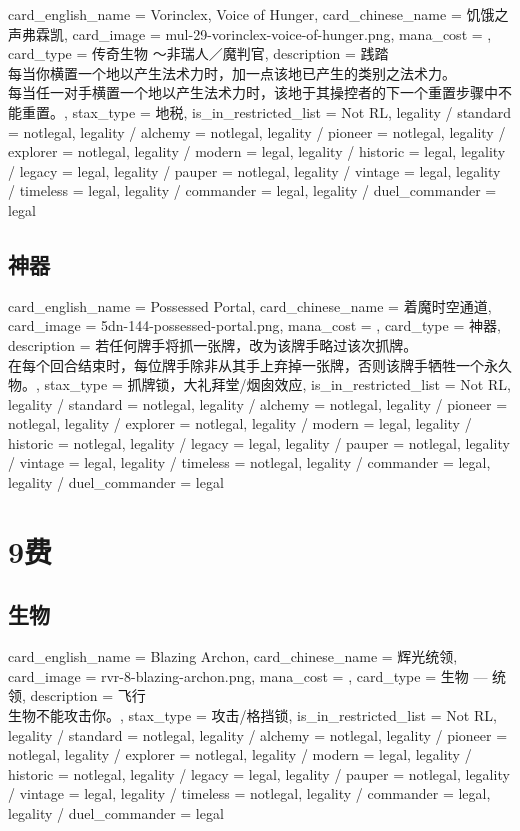 \documentclass[lang = cn, color = black, 10pt]{AllThatStax}
\begin{document}
\card
{
	card_english_name = {Vorinclex, Voice of Hunger},
	card_chinese_name = {饥饿之声弗霖凯},
	card_image = mul-29-vorinclex-voice-of-hunger.png,
	mana_cost = ,
	card_type = 传奇生物 ～非瑞人／魔判官,
	description = {践踏\\
		每当你横置一个地以产生法术力时，加一点该地已产生的类别之法术力。\\
		每当任一对手横置一个地以产生法术力时，该地于其操控者的下一个重置步骤中不能重置。},
	stax_type = 地税,
	is_in_restricted_list = Not RL,
	legality / standard = notlegal,
	legality / alchemy = notlegal,
	legality / pioneer = notlegal,
	legality / explorer = notlegal,
	legality / modern = legal,
	legality / historic = legal,
	legality / legacy = legal,
	legality / pauper = notlegal,
	legality / vintage = legal,
	legality / timeless = legal,
	legality / commander = legal,
	legality / duel_commander = legal
}

\section{神器}

\card
{
	card_english_name = {Possessed Portal},
	card_chinese_name = {着魔时空通道},
	card_image = 5dn-144-possessed-portal.png,
	mana_cost = ,
	card_type = 神器,
	description = {若任何牌手将抓一张牌，改为该牌手略过该次抓牌。\\
		在每个回合结束时，每位牌手除非从其手上弃掉一张牌，否则该牌手牺牲一个永久物。},
	stax_type = 抓牌锁，大礼拜堂/烟囱效应,
	is_in_restricted_list = Not RL,
	legality / standard = notlegal,
	legality / alchemy = notlegal,
	legality / pioneer = notlegal,
	legality / explorer = notlegal,
	legality / modern = legal,
	legality / historic = notlegal,
	legality / legacy = legal,
	legality / pauper = notlegal,
	legality / vintage = legal,
	legality / timeless = notlegal,
	legality / commander = legal,
	legality / duel_commander = legal
}

\chapter{9费}

\section{生物}

\card
{
	card_english_name = {Blazing Archon},
	card_chinese_name = {辉光统领},
	card_image = rvr-8-blazing-archon.png,
	mana_cost = ,
	card_type = 生物 — 统领,
	description = {飞行\\
		生物不能攻击你。},
	stax_type = 攻击/格挡锁,
	is_in_restricted_list = Not RL,
	legality / standard = notlegal,
	legality / alchemy = notlegal,
	legality / pioneer = notlegal,
	legality / explorer = notlegal,
	legality / modern = legal,
	legality / historic = notlegal,
	legality / legacy = legal,
	legality / pauper = notlegal,
	legality / vintage = legal,
	legality / timeless = notlegal,
	legality / commander = legal,
	legality / duel_commander = legal
}
\end{document}
